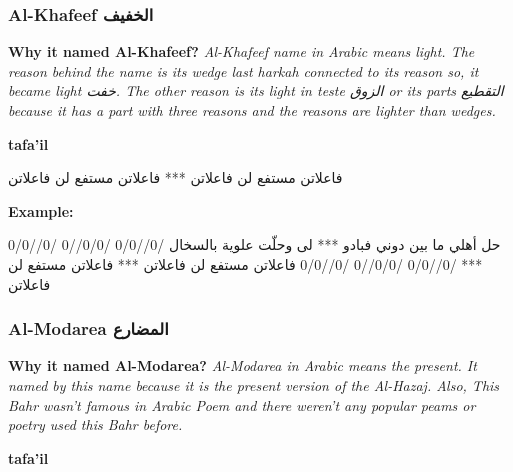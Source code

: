       \newpage
      

\subsubsection{Al-Khafeef \textarabic{الخفيف}}
\textbf{Why it named Al-Khafeef?}
\textit{Al-Khafeef name in Arabic means light. The reason behind the name is its wedge last harkah connected to its reason so, it became light \textarabic{خفت}. The other reason is its light in teste \textarabic{الزوق} or its parts \textarabic{التقطيع} because it has a part with three reasons and the reasons are lighter than wedges. }

\textbf{tafa'il}

\begin{Arabic}
  \begin{traditionalpoem*}

    فاعلاتن مستفع لن فاعلاتن *** فاعلاتن مستفع لن فاعلاتن
	\end{traditionalpoem*}
      \end{Arabic}


\textbf{Example:}

\begin{Arabic}
  \begin{traditionalpoem*}


    حل أهلي ما بين دوني فبادو *** لى وحلّت علوية بالسخال
    /0//0/0 /0/0//0  /0//0/0 *** /0//0/0 /0/0//0 /0//0/0
    فاعلاتن مستفع لن فاعلاتن *** فاعلاتن مستفع لن فاعلاتن

          
	\end{traditionalpoem*}
      \end{Arabic}

      

\subsubsection{Al-Modarea \textarabic{المضارع}}
\textbf{Why it named Al-Modarea?}
\textit{Al-Modarea in Arabic means the present. It named by this name because it is the present version of the Al-Hazaj. Also, This Bahr wasn't famous in Arabic Poem and there weren't any popular peams or poetry used this Bahr before. }

\textbf{tafa'il}

